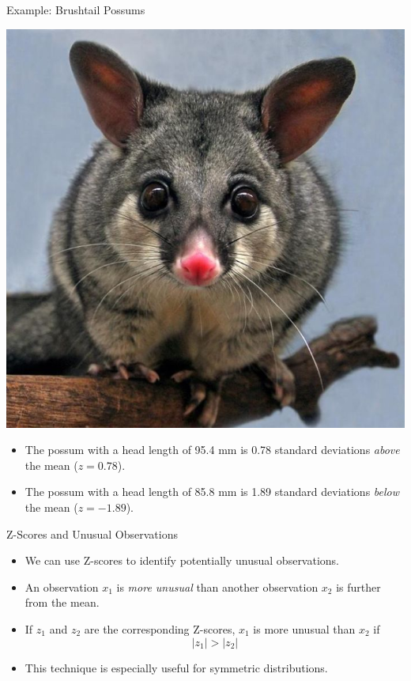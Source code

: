 \begin{frame}{Example: Brushtail Possums}
    \begin{center}
        \includegraphics[scale=0.2]{images/possum.jpg}
    \end{center}
    \vspace{-12pt}\begin{itemize}
        \item The possum with a head length of 95.4 mm is 0.78 standard deviations \textit{above} the mean ($z=0.78$).
        \item The possum with a head length of 85.8 mm is 1.89 standard deviations \textit{below} the mean ($z=-1.89$).
    \end{itemize}
\end{frame}

\begin{frame}{Z-Scores and Unusual Observations}
    \begin{itemize}
        \item We can use Z-scores to identify potentially unusual observations.
        \item An observation $x_1$ is \textit{more unusual} than another observation $x_2$ is further from the mean.
        \item If $z_1$ and $z_2$ are the corresponding Z-scores, $x_1$ is more unusual than $x_2$ if
        \[
            |z_1| > |z_2|
        \]
        \item This technique is especially useful for symmetric distributions.
    \end{itemize}
\end{frame}

